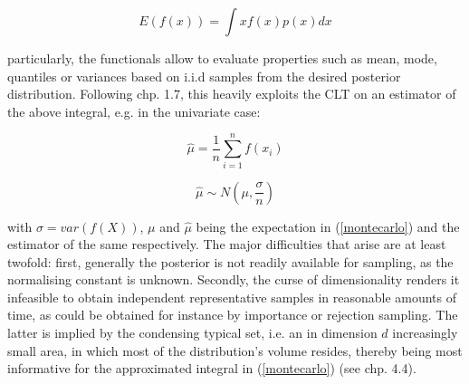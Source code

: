\documentclass[11pt]{article}
\begin{document}
        \begin{equation}\label{montecarlo}
            E(f(x)) = \int x f(x) p(x) dx
        \end{equation}

        particularly, the functionals allow to evaluate properties such as mean, mode, quantiles or variances based on i.i.d samples from the desired posterior distribution. Following \cite{brooks2011handbook} chp. 1.7, this heavily exploits the CLT on an estimator of the above integral, e.g. in the univariate case:

        \begin{equation}
            \hat{\mu} = \frac{1}{n}\sum_{i=1}^n f(x_i)
        \end{equation}

        \begin{equation} \label{clt}
            \hat{\mu} \sim N\left(\mu, \frac{\sigma}{n}\right)
        \end{equation}

        with $\sigma = var(f(X))$, $\mu$ and $\hat{\mu}$ being the expectation in (\ref{montecarlo}) and the  estimator of the same respectively.
        The major difficulties that arise are at least twofold: first, generally the posterior is not readily available for sampling, as the normalising constant is unknown. Secondly, the curse of dimensionality renders it infeasible to obtain independent representative samples in reasonable amounts of time, as could be obtained for instance by importance or rejection sampling. The latter is implied by the condensing typical set, i.e. an in dimension $d$ increasingly small area, in which most of the distribution's volume resides, thereby being most informative for the approximated integral in (\ref{montecarlo}) (see \cite{mackay2003information} chp. 4.4).
\end{document}
